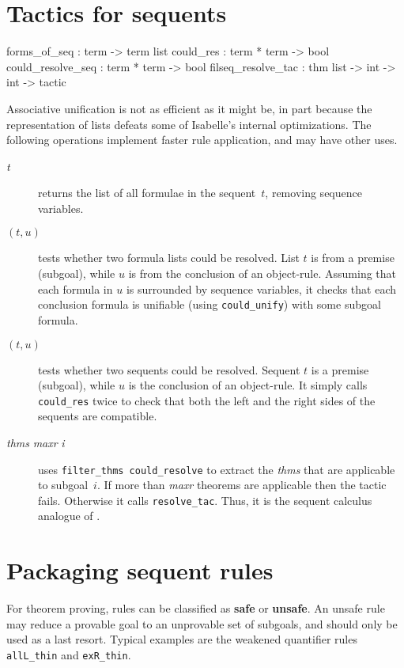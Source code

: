 \section{Tactics for sequents}
\begin{ttbox} 
forms_of_seq       : term -> term list
could_res          : term * term -> bool
could_resolve_seq  : term * term -> bool
filseq_resolve_tac : thm list -> int -> int -> tactic
\end{ttbox}
Associative unification is not as efficient as it might be, in part because
the representation of lists defeats some of Isabelle's internal
optimizations.  The following operations implement faster rule application,
and may have other uses.
\begin{description}
\item[ {\it t}] 
returns the list of all formulae in the sequent~$t$, removing sequence
variables.

\item[ $(t,u)$] 
tests whether two formula lists could be resolved.  List $t$ is from a
premise (subgoal), while $u$ is from the conclusion of an object-rule.
Assuming that each formula in $u$ is surrounded by sequence variables, it
checks that each conclusion formula is unifiable (using {\tt could_unify})
with some subgoal formula.

\item[ $(t,u)$] 
  tests whether two sequents could be resolved.  Sequent $t$ is a premise
  (subgoal), while $u$ is the conclusion of an object-rule.  It simply
  calls {\tt could_res} twice to check that both the left and the right
  sides of the sequents are compatible.

\item[ {\it thms} {\it maxr} {\it i}] 
uses {\tt filter_thms could_resolve} to extract the {\it thms} that are
applicable to subgoal~$i$.  If more than {\it maxr\/} theorems are
applicable then the tactic fails.  Otherwise it calls {\tt resolve_tac}.
Thus, it is the sequent calculus analogue of .
\end{description}



\section{Packaging sequent rules}
For theorem proving, rules can be classified as {\bf safe} or {\bf unsafe}.
An unsafe rule may reduce a provable goal to an unprovable set of subgoals,
and should only be used as a last resort.  Typical examples are the
weakened quantifier rules {\tt allL_thin} and {\tt exR_thin}.

